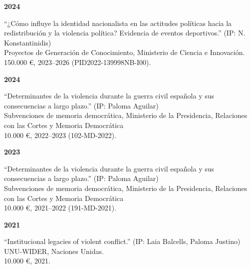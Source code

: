 \documentclass[a4paper, 12pt]{article}
\begin{document}
\noindent
\begin{minipage}[t]{0.1\textwidth}
\textbf{2024}
\end{minipage}\hfill\begin{minipage}[t]{0.9\textwidth}
``¿Cómo influye la identidad nacionalista en las actitudes políticas hacia la redistribución y la violencia política? Evidencia de eventos deportivos.'' (IP: N. Konstantinidis)\\
Proyectos de Generación de Conocimiento, Ministerio de Ciencia e Innovación.\\
150.000 €, 2023--2026 (PID2022-139998NB-I00).\\\vspace{-8pt}
\end{minipage}
\begin{minipage}[t]{0.1\textwidth}
\textbf{2024}
\end{minipage}\hfill\begin{minipage}[t]{0.9\textwidth}
``Determinantes de la violencia durante la guerra civil española y sus consecuencias a largo plazo.'' (IP: Paloma Aguilar)\\
Subvenciones de memoria democrática, Ministerio de la Presidencia, Relaciones con las Cortes y Memoria Democrática\\
10.000 €, 2022--2023 (102-MD-2022).\\\vspace{-8pt}
\end{minipage}
\begin{minipage}[t]{0.1\textwidth}
\textbf{2023}
\end{minipage}\hfill\begin{minipage}[t]{0.9\textwidth}
``Determinantes de la violencia durante la guerra civil española y sus consecuencias a largo plazo.'' (IP: Paloma Aguilar)\\
Subvenciones de memoria democrática, Ministerio de la Presidencia, Relaciones con las Cortes y Memoria Democrática\\
10.000 €, 2021--2022 (191-MD-2021).\\\vspace{-8pt}
\end{minipage}
\begin{minipage}[t]{0.1\textwidth}
\textbf{2021}
\end{minipage}\hfill\begin{minipage}[t]{0.9\textwidth}
``Institucional legacies of violent conflict.'' (IP: Laia Balcells, Paloma Justino)\\
UNU-WIDER, Naciones Unidas.\\
10.000 €, 2021.\\\vspace{-8pt}
\end{minipage}
\end{document}
